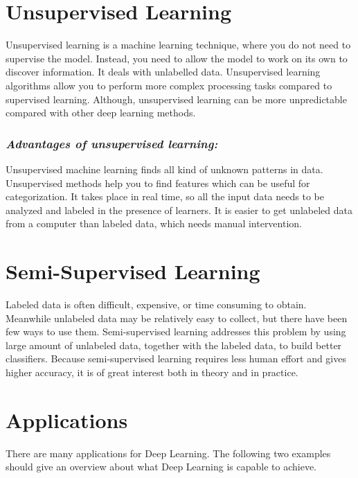 \section{Unsupervised Learning}
Unsupervised learning is a machine learning technique, where you do not need to supervise the model. Instead, you need to allow the model to work on its own to discover information. It deals with unlabelled data. Unsupervised learning algorithms allow you to perform more complex processing tasks compared to supervised learning. Although, unsupervised learning can be more unpredictable compared with other deep learning methods.

\subsubsection{\textit{Advantages of unsupervised learning:}}
Unsupervised machine learning finds all kind of unknown patterns in data.
Unsupervised methods help you to find features which can be useful for categorization.
It takes place in real time, so all the input data needs to be analyzed and labeled in the presence of learners.
It is easier to get unlabeled data from a computer than labeled data, which needs manual intervention.

\section{Semi-Supervised Learning}
Labeled data is often difficult, expensive, or time consuming to obtain.  Meanwhile unlabeled data may be relatively easy to collect, but there have been few ways to use them. Semi-supervised learning addresses this problem by using large amount of unlabeled data, together with the labeled data, to build better classifiers. Because semi-supervised learning requires less human effort and gives higher accuracy, it is of great interest both in theory and in practice.

\section{Applications}

There are many applications for Deep Learning. The following two examples should give an overview about what Deep Learning is capable to achieve. 

